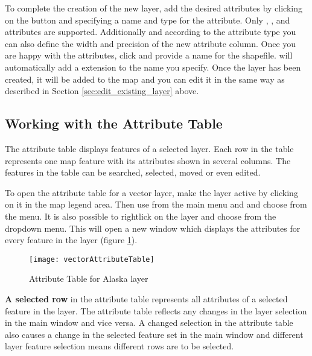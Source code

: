 To complete the creation of the new layer, add the desired attributes by
clicking on the  button and specifying a name and type for the
attribute. Only , , and
 attributes are supported. Additionally and
according to the attribute type you can also define the width and precision
of the new attribute column. Once you are happy with the attributes, click
 and provide a name for the shapefile. \qg will automatically add
a  extension to the name you specify. Once
the layer has been created, it will be added to the map and you can edit it in
the same way as described in Section \ref{sec:edit_existing_layer} above. 

\subsection{Working with the Attribute Table}\label{sec:attribute table}

The attribute table displays features of a selected layer. Each row in the table 
represents one map feature with its attributes shown in several columns. The 
features in the table can be searched, selected, moved or even edited.

To open the attribute table for a vector layer, make the layer active by clicking 
on it in the map legend area. Then use  from the main menu 
and and choose  
from the menu. It is also possible to rightlick on the layer and 
choose  from the 
dropdown menu. This will open a new window which displays the attributes for 
every feature in the layer (figure \ref{fig:attributetable}).

\begin{figure}[ht]
   \centering
   \texttt{[image: vectorAttributeTable]}
   \caption{Attribute Table for Alaska layer \nixcaption}\label{fig:attributetable}
\end{figure}


\textbf{A selected row} in the attribute table represents all attributes of a 
selected feature in the layer. The attribute table reflects any changes 
in the layer selection in the main window and vice versa. A changed selection 
in the attribute table also causes a change in the selected feature set in the 
main window and different layer feature selection means different rows are to be 
selected.

